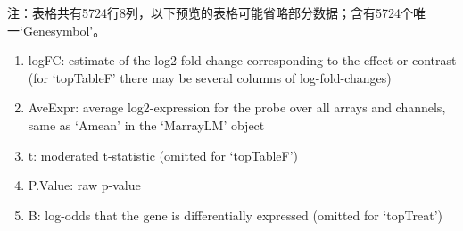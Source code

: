 \documentclass[
]{article}
\providecommand{\tightlist}{%
  \setlength{\itemsep}{0pt}\setlength{\parskip}{0pt}}
\begin{document}
\begin{center}\begin{tcolorbox}[colback=gray!10, colframe=gray!50, width=0.9\linewidth, arc=1mm, boxrule=0.5pt]注：表格共有5724行8列，以下预览的表格可能省略部分数据；含有5724个唯一`Genesymbol'。
\end{tcolorbox}
\end{center}
\begin{center}\begin{tcolorbox}[colback=gray!10, colframe=gray!50, width=0.9\linewidth, arc=1mm, boxrule=0.5pt]\begin{enumerate}\tightlist
\item logFC:  estimate of the log2-fold-change corresponding to the effect or contrast (for ‘topTableF’ there may be several columns of log-fold-changes)
\item AveExpr:  average log2-expression for the probe over all arrays and channels, same as ‘Amean’ in the ‘MarrayLM’ object
\item t:  moderated t-statistic (omitted for ‘topTableF’)
\item P.Value:  raw p-value
\item B:  log-odds that the gene is differentially expressed (omitted for ‘topTreat’)
\end{enumerate}\end{tcolorbox}
\end{center}
\end{document}

